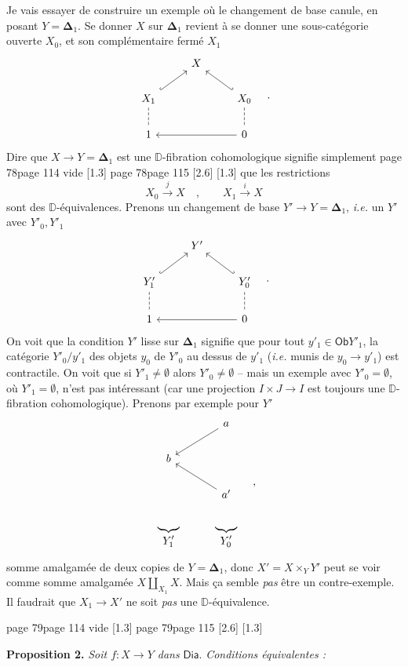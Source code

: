 \documentclass[11pt,leqno]{article}
\newcommand{\printedpage}[1]{\marginnote{\scriptsize\sffamily ed.\ #1}}
\newcommand{\msp}[1]{%
  \begingroup\def\thismsp{#1}\def\blankmsp{page 114 vide}%
  \ifx\thismsp\blankmsp
    \marginnote{\scriptsize\sffamily [114: vide]}[1.3\baselineskip]%
  \else\def\followingmsp{page 115}%
    \ifx\thismsp\followingmsp
      \marginnote{\scriptsize\sffamily [page 115]}[2.6\baselineskip]%
    \else\marginnote{\scriptsize\sffamily [#1]}[1.3\baselineskip]\fi
  \fi\endgroup}
\newcommand{\Dia}{\ensuremath{\mathsf{Dia}}}
\newcommand{\Ob}{\ensuremath{\mathsf{Ob}}}
\newcommand{\D}{\ensuremath{\mathbb{D}}}
\begin{document}
\hspace*{\parindent}Je vais essayer de construire un exemple où le changement de base canule, en posant $Y = \boldsymbol{\Delta}_1$. Se donner $X$ sur $\boldsymbol{\Delta}_1$ revient à se donner une sous-catégorie ouverte $X_0$, et son complémentaire fermé $X_1$
\[
\begin{tikzcd}
& X & \\
X_1 \arrow[ur, hook] \arrow[d, dash, dashed] & & X_0 \arrow[ul, hook'] \arrow[d, dash, dashed] \\
1 & & 0 \arrow[ll]
\end{tikzcd}
\quad .
\]
Dire que $X \to Y = \boldsymbol{\Delta}_1$ est une $\D$-fibration cohomologique signifie simplement
\msp{page 78}
que les restrictions
\[
X_0 \overset{j}{\longrightarrow} X \quad , \qquad X_1 \overset{i}{\longrightarrow} X
\]
sont des $\D$-équivalences. Prenons un changement de base $Y' \to Y = \boldsymbol{\Delta}_1$, \textit{i.e.} un $Y'$ avec $Y'_0, Y'_1$
\[
\begin{tikzcd}
& Y' & \\
Y'_1 \arrow[ur, hook] \arrow[d, dash, dashed] & & Y'_0 \arrow[ul, hook'] \arrow[d, dash, dashed] \\
1 & & 0 \arrow[ll]
\end{tikzcd}
\quad .
\]
On voit que la condition $Y'$ lisse sur $\boldsymbol{\Delta}_1$ signifie que pour tout $y'_1 \in \Ob Y'_1$, la catégorie $Y'_0/y'_1$ des objets $y_0$ de $Y'_0$ au dessus de $y'_1$ (\textit{i.e.} munis de $y_0 \to y'_1$) est contractile. On voit que si $Y'_1 \neq \emptyset$ alors $Y'_0 \neq \emptyset$ -- mais un exemple avec $Y'_0 = \emptyset$, où $Y'_1 = \emptyset$, n'est pas intéressant
\printedpage{48}
(car une projection $I \times J \to I$ est toujours une $\D$-fibration cohomologique). Prenons par exemple pour $Y'$
\[
\begin{tikzcd}
& a \arrow[dl] \\
b & \\
& a' \arrow[ul] \\
\underbrace{\qquad}_{\displaystyle Y'_1} & \underbrace{\qquad}_{\displaystyle Y'_0}
\end{tikzcd}
\quad ,
\]
somme amalgamée de deux copies de $Y = \boldsymbol{\Delta}_1$, donc $X' = X \times_Y Y'$ peut se voir comme somme amalgamée $X \amalg_{X_1} X$. Mais ça semble \textit{pas} être un contre-exemple. Il faudrait que $X_1 \to X'$ ne soit \textit{pas} une $\D$-équivalence.

\msp{page 79}

\textbf{Proposition 2.} \textit{Soit $f : X \to Y$ dans} \Dia. \textit{Conditions équivalentes :}
\end{document}
